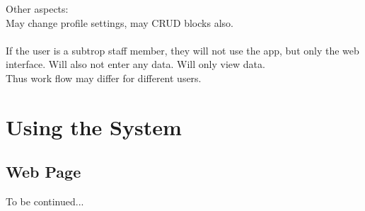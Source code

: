 \documentclass[11pt,a4paper,titlepage]{article}
\begin{document}
Other aspects:\\
May change profile settings, may CRUD blocks also.\\\\

If the user is a subtrop staff member, they will not use the app, but only the web interface. Will also not enter any data. Will only view data.\\

Thus work flow may differ for different users.



\section{Using the System}
\subsection{Web Page}
		 To be continued...
\end{document}
